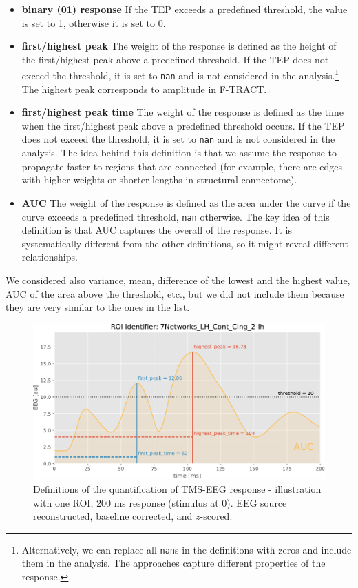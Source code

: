 \begin{itemize}
    \item \textbf{binary (01) response} If the TEP exceeds a predefined threshold, the value is set to 1, otherwise it is set to 0.
    \item \textbf{first/highest peak} The weight of the response is defined as the height of the first/highest peak above a predefined threshold. If the TEP does not exceed the threshold, it is set to \texttt{nan} and is not considered in the analysis.\footnote{Alternatively, we can replace all \texttt{nan}s in the definitions with zeros and include them in the analysis. The approaches capture different properties of the response.} The highest peak corresponds to amplitude in F-TRACT. 
    \item \textbf{first/highest peak time} The weight of the response is defined as the time when the first/highest peak above a predefined threshold occurs. If the TEP does not exceed the threshold, it is set to \texttt{nan} and is not considered in the analysis. The idea behind this definition is that we assume the response to propagate faster to regions that are  connected (for example, there are edges with higher weights or shorter lengths in structural connectome).
    \item \textbf{AUC} The weight of the response is defined as the area under the curve if the curve exceeds a predefined threshold, \texttt{nan} otherwise. The key idea of this definition is that AUC captures the overall  of the response. It is systematically different from the other definitions, so it might reveal different relationships.
\end{itemize}

We considered also variance, mean, difference of the lowest and the highest value, AUC of the area above the threshold, etc., but we did not include them because they are very similar to the ones in the list.

\begin{figure}
    \centering
    \includegraphics[width=\textwidth]{images/nootebook_generated/pytepfit_results/simulated/200/not_over_threshold_nan/7Networks_LH_Cont_Cing_2-lh_response_def.pdf}
    \caption[TMS-EEG response definitions -- illustration]{Definitions of the quantification of TMS-EEG response - illustration with one ROI, 200 ms response (stimulus at 0). EEG source reconstructed, baseline corrected, and $z$-scored.}
    \label{fig:tms-respondse-definition}
\end{figure}

